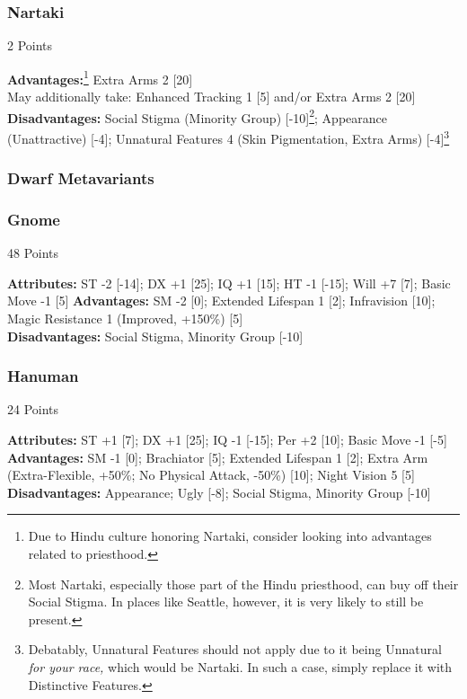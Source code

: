 \begin{multicols*}{3}
	\subsubsection*{Nartaki}
	\begin{flushright}
		2 Points
	\end{flushright}
	\textbf{Advantages:}\footnote{Due to Hindu culture honoring Nartaki, consider looking into advantages related to priesthood.} 
	Extra Arms 2 [20]
	\\May additionally take: Enhanced Tracking 1 [5] and/or Extra Arms 2 [20]
	\\\textbf{Disadvantages:} 
	Social Stigma (Minority Group) [-10]\footnote{Most Nartaki, especially those part of the Hindu priesthood, can buy off their Social Stigma. In places like Seattle, however, it is very likely to still be present.}; Appearance (Unattractive) [-4]; Unnatural Features 4 (Skin Pigmentation, Extra Arms) [-4]\footnote{Debatably, Unnatural Features should not apply due to it being Unnatural \textit{for your race,} which would be Nartaki. In such a case, simply replace it with Distinctive Features.}
	
	\subsubsection{Dwarf Metavariants}
	
	\subsubsection*{Gnome}
	\begin{flushright}
		48 Points
	\end{flushright}
	\textbf{Attributes:}
	ST -2 [-14]; DX +1 [25]; IQ +1 [15]; HT -1 [-15]; Will +7 [7]; Basic Move -1 [5]
	\textbf{Advantages:}
	SM -2 [0]; Extended Lifespan 1 [2]; Infravision [10]; Magic Resistance 1 (Improved, +150\%) [5]
	\\\textbf{Disadvantages:} 
	Social Stigma, Minority Group [-10]
	
	\subsubsection*{Hanuman}
	\begin{flushright}
		24 Points
	\end{flushright}
	\textbf{Attributes:}
	ST +1 [7]; DX +1 [25]; IQ -1 [-15]; Per +2 [10]; Basic Move -1 [-5]
	\textbf{Advantages:}
	SM -1 [0]; Brachiator [5]; Extended Lifespan 1 [2]; Extra Arm (Extra-Flexible, +50\%; No Physical Attack, -50\%) [10]; Night Vision 5 [5]
	\\\textbf{Disadvantages:} 
	Appearance; Ugly [-8]; Social Stigma, Minority Group [-10]
	

\end{multicols*}
